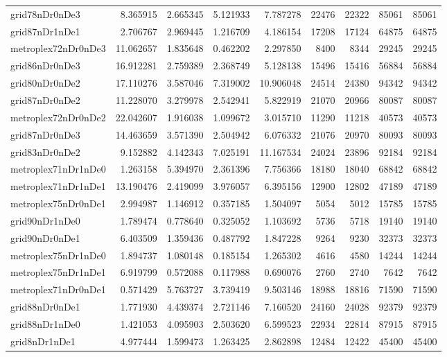 \begin{longtable}{|l|r|r|r|r|r|r|r|r|}
grid78nDr0nDe3 & 8.365915 & 2.665345 & 5.121933 & 7.787278 & 22476 & 22322 & 85061 & 85061 \\
grid87nDr1nDe1 & 2.706767 & 2.969445 & 1.216709 & 4.186154 & 17208 & 17124 & 64875 & 64875 \\
metroplex72nDr0nDe3 & 11.062657 & 1.835648 & 0.462202 & 2.297850 & 8400 & 8344 & 29245 & 29245 \\
grid86nDr0nDe3 & 16.912281 & 2.759389 & 2.368749 & 5.128138 & 15496 & 15416 & 56884 & 56884 \\
grid80nDr0nDe2 & 17.110276 & 3.587046 & 7.319002 & 10.906048 & 24514 & 24380 & 94342 & 94342 \\
grid87nDr0nDe2 & 11.228070 & 3.279978 & 2.542941 & 5.822919 & 21070 & 20966 & 80087 & 80087 \\
metroplex72nDr0nDe2 & 22.042607 & 1.916038 & 1.099672 & 3.015710 & 11290 & 11218 & 40573 & 40573 \\
grid87nDr0nDe3 & 14.463659 & 3.571390 & 2.504942 & 6.076332 & 21076 & 20970 & 80093 & 80093 \\
grid83nDr0nDe2 & 9.152882 & 4.142343 & 7.025191 & 11.167534 & 24024 & 23896 & 92184 & 92184 \\
metroplex71nDr1nDe0 & 1.263158 & 5.394970 & 2.361396 & 7.756366 & 18180 & 18040 & 68842 & 68842 \\
metroplex71nDr1nDe1 & 13.190476 & 2.419099 & 3.976057 & 6.395156 & 12900 & 12802 & 47189 & 47189 \\
metroplex75nDr0nDe1 & 2.994987 & 1.146912 & 0.357185 & 1.504097 & 5054 & 5012 & 15785 & 15785 \\
grid90nDr1nDe0 & 1.789474 & 0.778640 & 0.325052 & 1.103692 & 5736 & 5718 & 19140 & 19140 \\
grid90nDr0nDe1 & 6.403509 & 1.359436 & 0.487792 & 1.847228 & 9264 & 9230 & 32373 & 32373 \\
metroplex75nDr1nDe0 & 1.894737 & 1.080148 & 0.185154 & 1.265302 & 4616 & 4580 & 14244 & 14244 \\
metroplex75nDr1nDe1 & 6.919799 & 0.572088 & 0.117988 & 0.690076 & 2760 & 2740 & 7642 & 7642 \\
metroplex71nDr0nDe1 & 0.571429 & 5.763727 & 3.739419 & 9.503146 & 18988 & 18816 & 71590 & 71590 \\
grid88nDr0nDe1 & 1.771930 & 4.439374 & 2.721146 & 7.160520 & 24160 & 24028 & 92379 & 92379 \\
grid88nDr1nDe0 & 1.421053 & 4.095903 & 2.503620 & 6.599523 & 22934 & 22814 & 87915 & 87915 \\
grid8nDr1nDe1 & 4.977444 & 1.599473 & 1.263425 & 2.862898 & 12484 & 12422 & 45400 & 45400 \\

\end{longtable}
